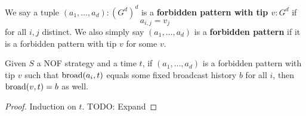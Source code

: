 \begin{definition}
  \label{def:forbidden-pattern}

  We say a tuple $(a_1, \dots, a_d) : (G^d)^d$ is a {\bf forbidden pattern with tip $v : G^d$} if
  $$a_{i, j} = v_j$$
  for all $i, j$ distinct. We also simply say $(a_1, \dots, a_d)$ is a {\bf forbidden pattern} if it is a forbidden pattern with tip $v$ for some $v$.
\end{definition}

\begin{lemma}
  \label{lem:mono-forbidden-pattern-tip}

  Given $S$ a NOF strategy and a time $t$, if $(a_1, \dots, a_d)$ is a forbidden pattern with tip $v$ such that $\operatorname{broad}(a_i, t)$ equals some fixed broadcast history $b$ for all $i$, then $\operatorname{broad}(v, t) = b$ as well.
\end{lemma}
\begin{proof}

  Induction on $t$. TODO: Expand
\end{proof}
